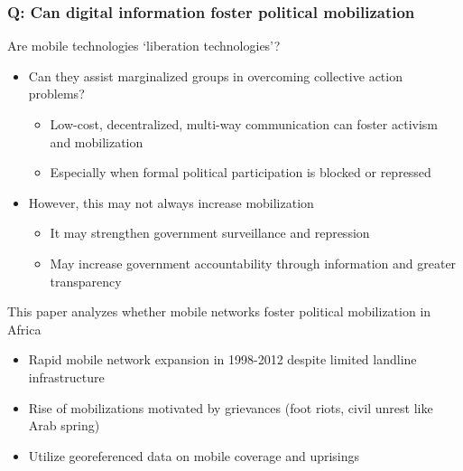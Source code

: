 \documentclass[aspectratio=169]{beamer}
\begin{document}
\begin{frame}
\frametitle{Q: Can digital information foster political mobilization} 
Are mobile technologies `liberation technologies'?
\begin{itemize}\setlength\itemsep{3pt}
\item Can they assist marginalized groups in overcoming collective action problems?
\begin{itemize}
\item Low-cost, decentralized, multi-way communication can foster activism and mobilization
\item Especially when formal political participation is blocked or repressed
\end{itemize}
\item However, this may not always increase mobilization
\begin{itemize}\setlength\itemsep{3pt}
\item It may strengthen government surveillance and repression
\item May increase government accountability through information and greater transparency
\end{itemize}
\end{itemize}\medskip
This paper analyzes whether mobile networks foster political mobilization in Africa
\begin{itemize}\setlength\itemsep{3pt}
\item  Rapid mobile network expansion in 1998-2012 despite limited landline infrastructure
\item Rise of mobilizations motivated by grievances (foot riots, civil unrest like Arab spring)
\item Utilize georeferenced data on mobile coverage and uprisings
\end{itemize}
\end{frame}
\end{document}

